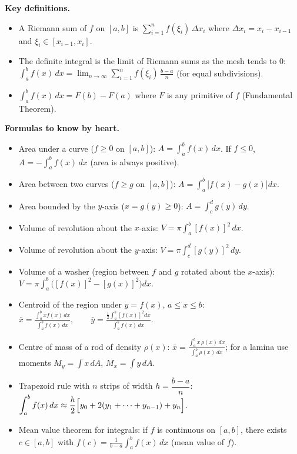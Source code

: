 \documentclass[11pt]{article}
\newcommand{\cle}[1]{{\popxbold\color{popdark}#1}}
\begin{document}
\begin{bilan}
\textbf{Key definitions.}
\begin{itemize}
\item A \cle{Riemann sum} of $f$ on $[a,b]$ is $\sum_{i=1}^{n} f(\xi_i)\,\Delta x_i$ where $\Delta x_i=x_i-x_{i-1}$ and $\xi_i\in[x_{i-1},x_i]$.
\item The \cle{definite integral} is the limit of Riemann sums as the mesh tends to $0$:
$\displaystyle \int_a^b f(x)\,dx=\lim_{n\to\infty}\sum_{i=1}^n f(\xi_i)\,\frac{b-a}{n}$ (for equal subdivisions).
\item $\displaystyle \int_a^b f(x)\,dx = F(b)-F(a)$ where $F$ is any primitive of $f$ (Fundamental Theorem).
\end{itemize}

\textbf{Formulas to know by heart.}
\begin{itemize}
\item Area under a curve ($f\ge 0$ on $[a,b]$): $\displaystyle A=\int_a^b f(x)\,dx$. If $f\le 0$, $A=-\displaystyle\int_a^b f(x)\,dx$ (area is always positive).
\item Area between two curves ($f\ge g$ on $[a,b]$): $\displaystyle A=\int_a^b \bigl[f(x)-g(x)\bigr]dx$.
\item Area bounded by the $y$-axis ($x=g(y)\ge 0$): $\displaystyle A=\int_c^d g(y)\,dy$.
\item Volume of revolution about the $x$-axis: $\displaystyle V=\pi\int_a^b [f(x)]^2\,dx$.
\item Volume of revolution about the $y$-axis: $\displaystyle V=\pi\int_c^d [g(y)]^2\,dy$.
\item Volume of a washer (region between $f$ and $g$ rotated about the $x$-axis): $\displaystyle V=\pi\int_a^b\bigl([f(x)]^2-[g(x)]^2\bigr)dx$.
\item Centroid of the region under $y=f(x)$, $a\le x\le b$:
$\displaystyle \bar{x}=\frac{\int_a^b x f(x)\,dx}{\int_a^b f(x)\,dx},\qquad \bar{y}=\frac{\tfrac12\int_a^b [f(x)]^2dx}{\int_a^b f(x)\,dx}$.
\item Centre of mass of a rod of density $\rho(x)$: $\displaystyle \bar{x}=\frac{\int_a^b x\,\rho(x)\,dx}{\int_a^b \rho(x)\,dx}$; for a lamina use moments $M_y=\int x\,dA$, $M_x=\int y\,dA$.
\item \cle{Trapezoid rule} with $n$ strips of width $h=\dfrac{b-a}{n}$:
$\displaystyle \int_a^b f(x)\,dx\approx \frac{h}{2}\Bigl[y_0+2(y_1+\dots+y_{n-1})+y_n\Bigr]$.
\item \cle{Mean value theorem for integrals}: if $f$ is continuous on $[a,b]$, there exists $c\in[a,b]$ with
$\displaystyle f(c)=\frac{1}{b-a}\int_a^b f(x)\,dx$ (mean value of $f$).
\end{itemize}


\end{bilan}
\end{document}
